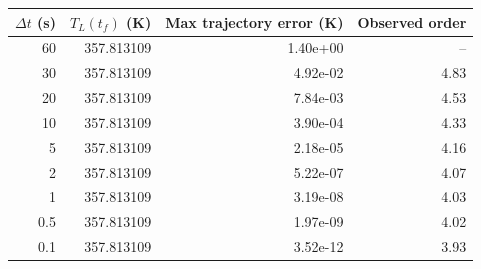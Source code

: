 \begin{tabular}{rrrr}
\toprule
$\Delta t$ (s) & $T_L(t_f)$ (K) & Max trajectory error (K) & Observed order \\
\midrule
60 & 357.813109 & 1.40e+00 & -- \\
30 & 357.813109 & 4.92e-02 & 4.83 \\
20 & 357.813109 & 7.84e-03 & 4.53 \\
10 & 357.813109 & 3.90e-04 & 4.33 \\
5 & 357.813109 & 2.18e-05 & 4.16 \\
2 & 357.813109 & 5.22e-07 & 4.07 \\
1 & 357.813109 & 3.19e-08 & 4.03 \\
0.5 & 357.813109 & 1.97e-09 & 4.02 \\
0.1 & 357.813109 & 3.52e-12 & 3.93 \\
\bottomrule
\end{tabular}
